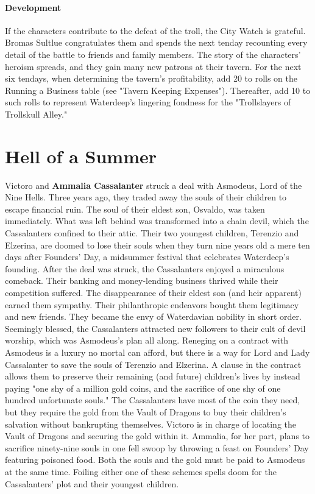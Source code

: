 \documentclass[10pt,a4paper,twoside,twocolumn,openany,nodeprecatedcode]{dndbook}
\begin{document}
\subsubsection{Development}
If the characters contribute to the defeat of the troll, the City Watch is grateful. Bromas Sultlue congratulates them and spends the next tenday recounting every detail of the battle to friends and family members. The story of the characters' heroism spreads, and they gain many new patrons at their tavern. For the next six tendays, when determining the tavern's profitability, add 20 to rolls on the Running a Business table (see "Tavern Keeping Expenses"). Thereafter, add 10 to such rolls to represent Waterdeep's lingering fondness for the "Trollslayers of Trollskull Alley."
\chapter{Hell of a Summer}
Victoro and \textbf{Ammalia Cassalanter} struck a deal with Asmodeus, Lord of the Nine Hells. Three years ago, they traded away the souls of their children to escape financial ruin. The soul of their eldest son, Osvaldo, was taken immediately. What was left behind was transformed into a chain devil, which the Cassalanters confined to their attic. Their two youngest children, Terenzio and Elzerina, are doomed to lose their souls when they turn nine years old a mere ten days after Founders' Day, a midsummer festival that celebrates Waterdeep's founding.
After the deal was struck, the Cassalanters enjoyed a miraculous comeback. Their banking and money-lending business thrived while their competition suffered. The disappearance of their eldest son (and heir apparent) earned them sympathy. Their philanthropic endeavors bought them legitimacy and new friends. They became the envy of Waterdavian nobility in short order. Seemingly blessed, the Cassalanters attracted new followers to their cult of devil worship, which was Asmodeus's plan all along.
Reneging on a contract with Asmodeus is a luxury no mortal can afford, but there is a way for Lord and Lady Cassalanter to save the souls of Terenzio and Elzerina. A clause in the contract allows them to preserve their remaining (and future) children's lives by instead paying "one shy of a million gold coins, and the sacrifice of one shy of one hundred unfortunate souls." The Cassalanters have most of the coin they need, but they require the gold from the Vault of Dragons to buy their children's salvation without bankrupting themselves.
Victoro is in charge of locating the Vault of Dragons and securing the gold within it. Ammalia, for her part, plans to sacrifice ninety-nine souls in one fell swoop by throwing a feast on Founders' Day featuring poisoned food. Both the souls and the gold must be paid to Asmodeus at the same time. Foiling either one of these schemes spells doom for the Cassalanters' plot and their youngest children.
\end{document}
